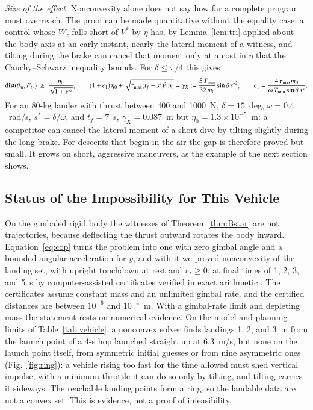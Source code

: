 \emph{Size of the effect.} Nonconvexity alone does not say how far a complete program must overreach. The proof can be made
quantitative without the equality case: a control whose $W_z$ falls short of $V^*$ by $\eta$ has, by Lemma~\ref{lem:tri}
applied about the body axis at an early instant, nearly the lateral moment of a witness, and tilting during the brake can
cancel that moment only at a cost in $\eta$ that the Cauchy--Schwarz inequality bounds. For $\delta\le\pi/4$ this gives
\begin{equation}\label{eq:eta}
\operatorname{dist}(\theta_m,\F)\ \ge\ \frac{\eta_0}{\sqrt{1+s^{*2}}},\qquad
(1+c_1)\,\eta_0+\sqrt{\tau_{\max}(t_f-s^*)^2\,\eta_0}=\gamma_X:=\frac{5\,\Tmin}{32\,m_0}\sin\delta\,s^{*2},\qquad
c_1=\frac{4\,\tau_{\max}m_0}{\omega\,\Tmin\sin\delta\,s^*} .
\end{equation}
For an 80-kg lander with
thrust between 400 and 1000~N, $\delta=15$~deg, $\omega=0.4$~rad/s, $s^*=\delta/\omega$, and $t_f=7$~s, $\gamma_X=0.087$~m but
$\eta_0=1.3\times10^{-5}$~m: a competitor can cancel the lateral moment of a short dive by tilting slightly during the long
brake. For descents that begin
in the air the gap is therefore proved but small. It grows on short, aggressive maneuvers, as the example of the next
section shows.

\subsection{Status of the Impossibility for This Vehicle}
On the gimbaled rigid body the witnesses of Theorem~\ref{thm:Bstar} are not trajectories, because deflecting the thrust
outward rotates the body inward. Equation~\eqref{eq:cop} turns the problem into one with zero gimbal angle and a bounded
angular acceleration for $y$, and with it we proved nonconvexity of the landing set, with upright touchdown at rest and
$r_z\ge0$, at final times of 1, 2, 3, and 5~s by computer-assisted certificates verified in exact arithmetic \cite{repo}. The
certificates assume constant mass and an unlimited gimbal rate, and the certified distances are between $10^{-6}$ and
$10^{-4}$~m. With a gimbal-rate limit and depleting mass the statement rests on numerical evidence. On the model and planning
limits of Table~\ref{tab:vehicle}, a nonconvex solver \cite{ipopt} finds landings 1, 2, and 3~m from the launch point of a
4-s hop launched straight up at 6.3~m/s, but none on the launch point itself, from symmetric initial guesses or from nine
asymmetric ones (Fig.~\ref{fig:ring}): a vehicle rising too fast for the time allowed must shed vertical impulse, with a minimum throttle it can do
so only by tilting, and tilting carries it sideways. The reachable landing points form a ring, so the landable data are not a
convex set. This is evidence, not a proof of infeasibility.

